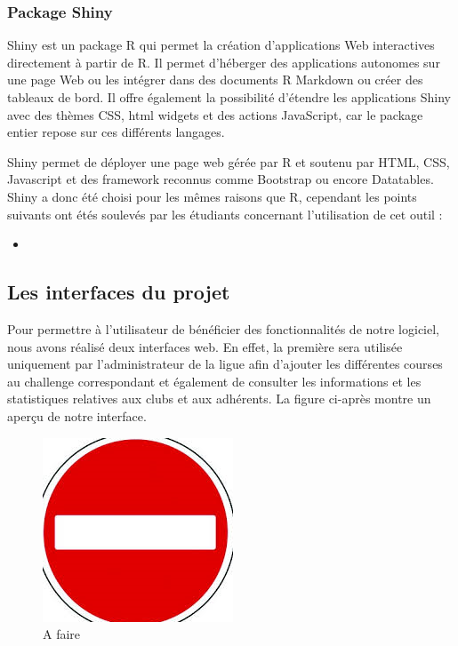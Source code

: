\subsubsection {Package Shiny}

Shiny est un package R qui permet la création d'applications Web interactives directement à partir de R. Il permet d’héberger des applications autonomes sur une page Web ou les intégrer dans des documents R Markdown ou créer des tableaux de bord. Il offre également la possibilité d’étendre les applications Shiny avec des thèmes CSS, html widgets et des actions JavaScript, car le package entier repose sur ces différents langages.

Shiny permet de déployer une page web gérée par R et soutenu par HTML, CSS, Javascript et des framework reconnus comme Bootstrap ou encore Datatables.
Shiny a donc été choisi pour les mêmes raisons que R, cependant les points suivants ont étés soulevés par les étudiants concernant l'utilisation de cet outil :

\begin{itemize} 
	\item 
\end{itemize}

  

\subsection {Les interfaces du projet }
Pour permettre à l’utilisateur de bénéficier des fonctionnalités de notre logiciel, nous avons réalisé deux interfaces web. En effet, la première sera utilisée uniquement par l’administrateur de la ligue afin d’ajouter les différentes courses au challenge correspondant et également de consulter les informations et les statistiques relatives aux clubs et aux adhérents.
La figure ci-après montre un aperçu de notre interface. 

\begin{figure}
	  \center
	  \includegraphics[scale=0.5]{img/A_faire.png}
	   \caption {A faire }
\end{figure}

